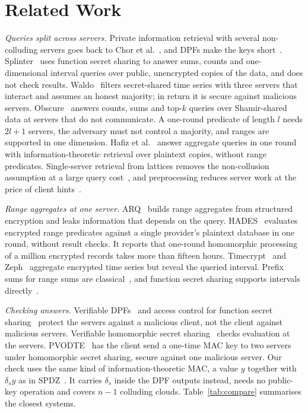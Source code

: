 \documentclass[10pt,journal,compsoc]{IEEEtran}
\begin{document}
\section{Related Work}
\label{sec:related}

\emph{Queries split across servers.} Private information retrieval with
several non-colluding servers goes back to Chor et
al.~\cite{chor1998private}, and DPFs make the keys
short~\cite{gilboa2014distributed,boyle2015function,boyle2016function}.
Splinter~\cite{splinter} uses function secret sharing to answer sums, counts
and one-dimensional interval queries over public, unencrypted copies of the
data, and does not check results. Waldo~\cite{waldo} filters secret-shared time
series with three servers that interact and assumes an honest majority; in
return it is secure against malicious servers. Obscure~\cite{gupta2019obscure,gupta2020obscure}
answers counts, sums and top-$k$ queries over Shamir-shared data at servers
that do not communicate. A one-round predicate of length $l$ needs $2l+1$
servers, the adversary must not control a majority, and ranges are supported
in one dimension. Hafiz et al.~\cite{hafiz2024private} answer aggregate queries
in one round with information-theoretic retrieval over plaintext copies,
without range predicates. Single-server retrieval from lattices removes the
non-collusion assumption at a large query cost~\cite{angel2018pir,menon2022spiral},
and preprocessing reduces server work at the price of client
hints~\cite{corrigan2020private}.

\emph{Range aggregates at one server.} ARQ~\cite{espiritu2022arq} builds range
aggregates from structured encryption and leaks information that depends on the
query. HADES~\cite{liu2025hades} evaluates encrypted range predicates against a
single provider's plaintext database in one round, without result checks. It
reports that one-round homomorphic processing of a million encrypted records
takes more than fifteen hours. Timecrypt~\cite{timecrypt} and Zeph~\cite{zeph}
aggregate encrypted time series but reveal the queried interval. Prefix sums
for range sums are classical~\cite{ho1997range,crow1984summed}, and function
secret sharing supports intervals directly~\cite{boyle2016function}.

\emph{Checking answers.} Verifiable DPFs~\cite{decastro2022lightweight} and
access control for function secret sharing~\cite{pacl,ji2023finegrained}
protect the servers against a malicious client, not the client against
malicious servers. Verifiable homomorphic secret sharing~\cite{choudhuri2024vehss}
checks evaluation at the servers. PVODTE~\cite{li2026silent} has the client
send a one-time MAC key to two servers under homomorphic secret sharing,
secure against one malicious server. Our check uses the same kind of
information-theoretic MAC, a value $y$ together with $\delta_s y$ as in
SPDZ~\cite{damgard2012spdz}. It carries $\delta_s$ inside the DPF outputs
instead, needs no public-key operation and covers $n-1$ colluding clouds.
Table~\ref{tab:compare} summarises the closest systems.
\end{document}
